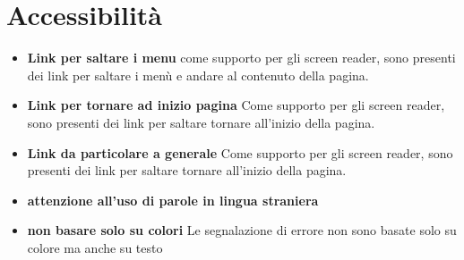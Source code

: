 \documentclass[1_relazione.tex]{subfiles}
\begin{document}
\section{Accessibilit\`{a}}
\begin{itemize}
\item\textbf{Link per saltare i menu} come supporto per gli screen reader, sono presenti dei link per saltare i menù e andare al contenuto della pagina.

\item\textbf{Link per tornare ad inizio pagina} Come supporto per gli screen reader, sono presenti dei link per saltare tornare all'inizio della pagina.

\item\textbf{Link da particolare a generale} Come supporto per gli screen reader, sono presenti dei link per saltare tornare all'inizio della pagina.

\item\textbf{attenzione all'uso di parole in lingua straniera}

\item\textbf{non basare solo su colori} Le segnalazione di errore non sono basate solo su colore ma anche su testo
\end{itemize}
\end{document}
